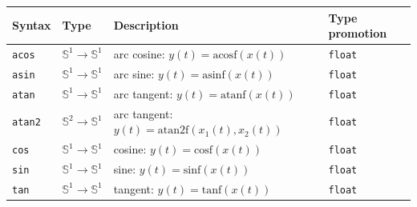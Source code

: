 \bigskip

\begin{tabular}{|l|l|l|l|}

\hline
\textbf{Syntax} & \textbf{Type}  & \textbf{Description} & \textbf{Type promotion} \\
\hline

\texttt{acos} & $\mathbb{S}^{1}\rightarrow\mathbb{S}^{1}$ & arc cosine: $y(t)=\mathrm{acosf}(x(t))$  & \texttt{float} \\
\texttt{asin} & $\mathbb{S}^{1}\rightarrow\mathbb{S}^{1}$ & arc sine: $y(t)=\mathrm{asinf}(x(t))$  & \texttt{float} \\
\texttt{atan} & $\mathbb{S}^{1}\rightarrow\mathbb{S}^{1}$ & arc tangent: $y(t)=\mathrm{atanf}(x(t))$ & \texttt{float} \\
\texttt{atan2} & $\mathbb{S}^{2}\rightarrow\mathbb{S}^{1}$ & arc tangent: $y(t)=\mathrm{atan2f}(x_{1}(t), x_{2}(t))$  & \texttt{float}\\

\texttt{cos} & $\mathbb{S}^{1}\rightarrow\mathbb{S}^{1}$ & cosine: $y(t)=\mathrm{cosf}(x(t))$ & \texttt{float} \\
\texttt{sin} & $\mathbb{S}^{1}\rightarrow\mathbb{S}^{1}$ & sine: $y(t)=\mathrm{sinf}(x(t))$  & \texttt{float}\\
\texttt{tan} & $\mathbb{S}^{1}\rightarrow\mathbb{S}^{1}$ & tangent: $y(t)=\mathrm{tanf}(x(t))$  & \texttt{float}\\


\end{tabular}
